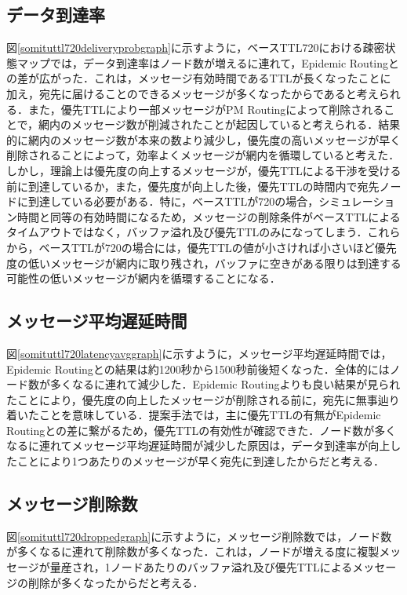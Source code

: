 \documentclass[11pt]{icsthesis}
\begin{document}
\subsection{データ到達率}
図\ref{somituttl720deliveryprobgraph}に示すように，ベースTTL720における疎密状態マップでは，データ到達率はノード数が増えるに連れて，Epidemic Routingとの差が広がった．これは，メッセージ有効時間であるTTLが長くなったことに加え，宛先に届けることのできるメッセージが多くなったからであると考えられる．また，優先TTLにより一部メッセージがPM Routingによって削除されることで，網内のメッセージ数が削減されたことが起因していると考えられる．結果的に網内のメッセージ数が本来の数より減少し，優先度の高いメッセージが早く削除されることによって，効率よくメッセージが網内を循環していると考えた．しかし，理論上は優先度の向上するメッセージが，優先TTLによる干渉を受ける前に到達しているか，また，優先度が向上した後，優先TTLの時間内で宛先ノードに到達している必要がある．特に，ベースTTLが720の場合，シミュレーション時間と同等の有効時間になるため，メッセージの削除条件がベースTTLによるタイムアウトではなく，バッファ溢れ及び優先TTLのみになってしまう．これらから，ベースTTLが720の場合には，優先TTLの値が小さければ小さいほど優先度の低いメッセージが網内に取り残され，バッファに空きがある限りは到達する可能性の低いメッセージが網内を循環することになる．

\subsection{メッセージ平均遅延時間}
図\ref{somituttl720latencyavggraph}に示すように，メッセージ平均遅延時間では，Epidemic Routingとの結果は約1200秒から1500秒前後短くなった．全体的にはノード数が多くなるに連れて減少した．Epidemic Routingよりも良い結果が見られたことにより，優先度の向上したメッセージが削除される前に，宛先に無事辿り着いたことを意味している．提案手法では，主に優先TTLの有無がEpidemic Routingとの差に繋がるため，優先TTLの有効性が確認できた．ノード数が多くなるに連れてメッセージ平均遅延時間が減少した原因は，データ到達率が向上したことにより1つあたりのメッセージが早く宛先に到達したからだと考える．

\subsection{メッセージ削除数}
図\ref{somituttl720droppedgraph}に示すように，メッセージ削除数では，ノード数が多くなるに連れて削除数が多くなった．これは，ノードが増える度に複製メッセージが量産され，1ノードあたりのバッファ溢れ及び優先TTLによるメッセージの削除が多くなったからだと考える．
\end{document}
